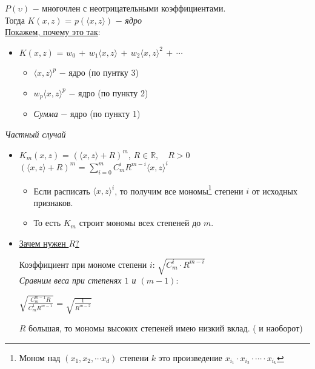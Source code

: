         $P(\upsilon)$ $-$ многочлен с неотрицательными коэффициентами.\\

        Тогда $K(x, z)$ = $p(\langle x, z \rangle)$ $-$ \textit{ядро}\\

        \underline{Покажем, почему это так}:
        \begin{itemize}
            \item $K(x, z)$ = $w_0 \, + \, w_1\langle x, z \rangle \, + \, w_2\langle x, z \rangle^2 \, + \, \cdots$

            \begin{itemize}
                \item $\langle x, z \rangle^p$ $-$ ядро (по пунтку 3)

                \item $w_p\langle x, z \rangle^p$ $-$ ядро (по пункту 2)

                \item \textit{Сумма} $-$ ядро (по пункту 1)
            \end{itemize}
        \end{itemize}

        \textit{Частный случай}
        \begin{itemize}
            \item $K_m(x, z)$ = $(\langle x, z \rangle + R)^m$, \quad $R \in \mathbb{R}, \quad R > 0$\\

            \quad\quad $(\langle x, z \rangle + R)^m$ = $\sum\limits_{i = 0}^m C_m^iR^{m - i}\langle x, z \rangle^i $

            \begin{itemize}
                \item Если расписать $\langle x, z \rangle^i$, то получим все мономы\footnote{Моном над $(x_1, x_2, \cdots x_d)$ степени $k$ это произведение $x_{i_1}\cdot x_{i_2} \cdot \cdots  \cdot x_{i_k}$} степени $i$ от исходных признаков.

                \item То есть $K_m$ строит мономы всех степеней до $m$.
            \end{itemize}


            \item{\underline{Зачем нужен $R$?}}

            Коэффициент при мономе степени $i$: $\sqrt{C_m^i \cdot R^{m - i}}$\\

            \textit{Сравним веса при степенях $1$ и $(m - 1)$}:
            \begin{center}
            \Large
                $\sqrt{\frac{C_m^{m - 1}R}{C_m^{1}R^{m - 1} }}$ = $\sqrt{\frac{1}{R^{m - 2}}}$
            \end{center}

            $R$ большая, то мономы высоких степеней имею низкий вклад. ( и наоборот)

            
        \end{itemize}


